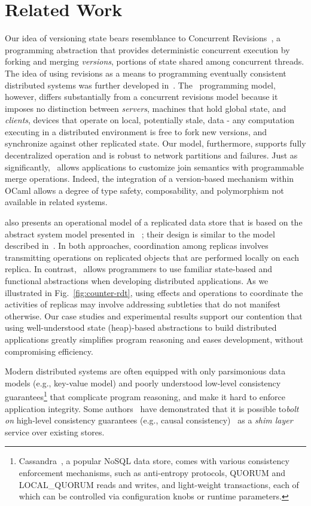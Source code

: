 \section{Related Work}
\label{sec:related}

Our idea of versioning state bears resemblance to Concurrent
Revisions~\cite{BBL+10}, a programming abstraction that provides
deterministic concurrent execution by forking and merging
\emph{versions}, portions of state shared among concurrent threads.
The idea of using revisions as a means to programming eventually
consistent distributed systems was further developed
in~\cite{BFL+12,Burckhardt2012}.  The \name\ programming model,
however, differs substantially from a concurrent revisions model
because it imposes no distinction between \emph{servers}, machines
that hold global state, and \emph{clients}, devices that operate on
local, potentially stale, data - any computation executing in a
distributed environment is free to fork new versions, and synchronize
against other replicated state.  Our model, furthermore, supports
fully decentralized operation and is robust to network partitions and
failures. Just as significantly, \name\ allows applications to
customize join semantics with programmable merge operations.  Indeed,
the integration of a version-based mechanism within OCaml allows a
degree of type safety, composability, and polymorphism not available
in related systems.

\cite{Burckhardt2015} also presents an operational model of a
replicated data store that is based on the abstract system model
presented in ~\cite{Burckhardt2014}; their design is similar to the
model described in~\cite{pldi15}.  In both approaches, coordination
among replicas involves transmitting operations on replicated objects
that are performed locally on each replica.  In contrast,
\name\ allows programmers to use familiar state-based and functional
abstractions when developing distributed applications.  As we
illustrated in Fig.~\ref{fig:counter-rdt}, using effects and
operations to coordinate the activities of replicas may involve
addressing subtleties that do not manifest otherwise.  Our case
studies and experimental results support our contention that using
well-understood state (heap)-based abstractions to build distributed
applications greatly simplifies program reasoning and eases
development, without compromising efficiency.

Modern distributed systems are often equipped with only parsimonious
data models (e.g., key-value model) and poorly understood low-level
consistency guarantees\footnote{Cassandra~\cite{Cassandra}, a popular
  NoSQL data store, comes with various consistency enforcement
  mechanisms, such as anti-entropy protocols, {\sc QUORUM} and {\sc
    LOCAL\_QUORUM} reads and writes, and light-weight transactions,
  each of which can be controlled via configuration knobs or runtime
  parameters.}  that complicate program reasoning, and make it hard to
enforce application integrity. Some authors~\cite{bailis-bolton} have
demonstrated that it is possible to\emph{bolt on} high-level
consistency guarantees (e.g., causal consistency)~\cite{COPS,BEG+17}
as a \emph{shim layer} service over existing stores.

